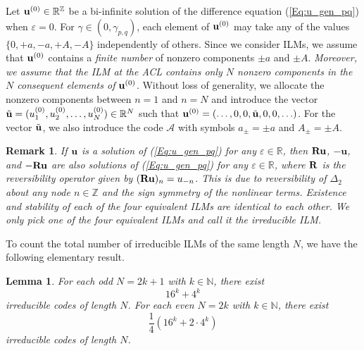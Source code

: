 \documentclass[12pt,reqno]{amsart}
\newtheorem{remark}{Remark}
\newtheorem{lemma}{Lemma}
\begin{document}
Let ${\bf u}^{(0)} \in \mathbb{R}^{\mathbb{Z}}$ be a bi-infinite solution of the difference equation (\ref{Eq:u_gen_pq}) when  $\varepsilon=0$.  For $\gamma \in (0,\gamma_{{p,q}})$, each element of ${\bf u}^{(0)}$ may take any of the values $\{0,+a,-a,+A,-A\}$ independently of others. Since we consider ILMs, we assume that  ${\bf u}^{(0)}$ contains a {\it finite number} of nonzero components $\pm a$ and $\pm A$. {\em Moreover, we assume that the ILM at the ACL contains only $N$ nonzero components in the $N$ consequent elements of ${\bf u}^{(0)}$}. Without loss of generality, we allocate the nonzero components between $n = 1$ and $n = N$ and introduce the vector $\tilde{\bf u} = (u_1^{(0)},u_2^{(0)},\ldots,u_N^{(0)}) \in \mathbb{R}^N$ such that 
${\bf u}^{(0)} = (\ldots,0,0,\tilde{\bf u},0,0,\ldots)$. For the vector $\tilde{\bf u}$, we also introduce the code $\mathcal{A}$ with symbols $a_{\pm} = \pm a$ and $A_{\pm} = \pm A$. 

\begin{remark} 
	If ${\bf u}$ is a solution of (\ref{Eq:u_gen_pq}) for any $\varepsilon \in \mathbb{R}$, then ${\bf R} \mathbf{u}$, $-{\mathbf{u}}$, and $-{\bf R} \mathbf{u}$ are also solutions of (\ref{Eq:u_gen_pq}) for any $\varepsilon \in \mathbb{R}$, 
	where ${\bf R}$ is the reversibility operator given by $({\bf R u})_n = u_{-n}$. This is due to reversibility of $\Delta_2$ about any node $n \in \mathbb{Z}$ and the sign symmetry of the nonlinear terms. Existence and stability of each of the four equivalent ILMs are identical to each other. We only pick one of the four equivalent ILMs and call it the irreducible ILM.
\end{remark}

To count the total number of irreducible ILMs of the same length $N$, 
we have the following elementary result.

\begin{lemma}
	\label{lem-2}
For each odd $N = 2k + 1$ with $k \in \mathbb{N}$, there exist 
$$ 
16^k+ 4^k
$$ 
irreducible codes of length $N$. For each even $N = 2k$ with $k \in \mathbb{N}$, there exist 
$$
\frac14 (16^k+2\cdot 4^k)
$$ 
irreducible codes of length $N$. 
\end{lemma}
\end{document}
